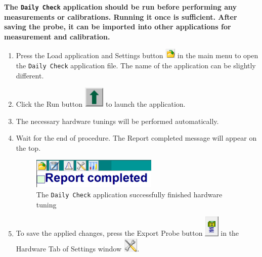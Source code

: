\documentclass[a4paper,12pt]{article}
\begin{document}
\textbf{The \texttt{Daily Check} application should be run before performing any measurements or calibrations. Running it once is sufficient. After saving the probe, it can be imported into other applications for measurement and calibration.}

\begin{enumerate}
\item Press the Load application and Settings button \includegraphics[height=0.5cm]{Btn_Open.png} in the main menu to open the \texttt{Daily Check} application file. The name of the application can be slightly different.

\item Click the Run button \includegraphics[height=1cm]{Btn_Start.jpg} to launch the application.

\item The necessary hardware tunings will be performed automatically.

\item Wait for the end of procedure. The Report completed message will appear on the top.

\begin{figure}[H]
\centering
\includegraphics[width=6cm]{Report_Completed.png}
\caption{The \texttt{Daily Check} application successfully finished hardware tuning}
\label{fig:Report_Completed}
\end{figure}

\item To save the applied changes, press the Export Probe button \includegraphics[width=0.7cm]{Settings_Export.png} in the Hardware Tab of Settings window \includegraphics[width=0.7cm]{Btn_Settings.png}.


\end{enumerate}
\end{document}
